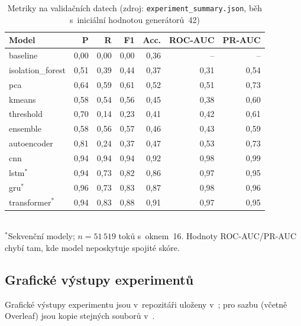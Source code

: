 \begin{table}[htbp]
\centering
\caption[Metriky na validačních datech]{Metriky na validačních datech (zdroj: \texttt{experiment\_summary.json}, běh s~iniciální hodnotou generátorů~42)}
\label{tab:metriky-vsechny}
\footnotesize
\setlength{\tabcolsep}{3.5pt}
\begin{tabular}{lrrrrrr}
\toprule
Model & P & R & F1 & Acc. & ROC-AUC & PR-AUC \\
\midrule
baseline             & 0{,}00 & 0{,}00 & 0{,}00 & 0{,}36 & --   & --   \\
isolation\_forest    & 0{,}51 & 0{,}39 & 0{,}44 & 0{,}37 & 0{,}31 & 0{,}54 \\
pca                  & 0{,}64 & 0{,}59 & 0{,}61 & 0{,}52 & 0{,}51 & 0{,}73 \\
kmeans               & 0{,}58 & 0{,}54 & 0{,}56 & 0{,}45 & 0{,}38 & 0{,}60 \\
threshold            & 0{,}70 & 0{,}14 & 0{,}23 & 0{,}41 & 0{,}42 & 0{,}61 \\
ensemble             & 0{,}58 & 0{,}56 & 0{,}57 & 0{,}46 & 0{,}43 & 0{,}59 \\
\midrule
autoencoder          & 0{,}81 & 0{,}24 & 0{,}37 & 0{,}47 & 0{,}53 & 0{,}73 \\
cnn                  & 0{,}94 & 0{,}94 & 0{,}94 & 0{,}92 & 0{,}98 & 0{,}99 \\
lstm$^{*}$           & 0{,}94 & 0{,}73 & 0{,}82 & 0{,}86 & 0{,}97 & 0{,}95 \\
gru$^{*}$            & 0{,}96 & 0{,}73 & 0{,}83 & 0{,}87 & 0{,}98 & 0{,}96 \\
transformer$^{*}$    & 0{,}94 & 0{,}83 & 0{,}88 & 0{,}91 & 0{,}97 & 0{,}95 \\
\bottomrule
\end{tabular}
\\[0.5em]
\footnotesize $^{*}$Sekvenční modely; $n = 51\,519$ toků s~oknem~16. Hodnoty ROC-AUC/PR-AUC chybí tam, kde model neposkytuje spojité skóre.
\end{table}

\subsection{Grafické výstupy experimentů}
\label{sec:graficke-vystupy}

Grafické výstupy experimentu jsou v~repozitáři uloženy v~; pro sazbu (včetně Overleaf) jsou kopie stejných souborů v~.

